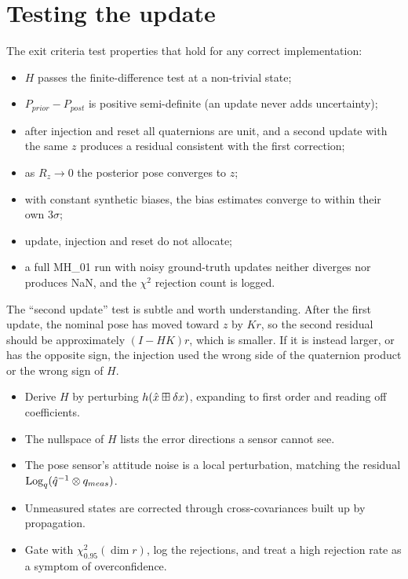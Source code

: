 \section{Testing the update}

\begin{projectlink}[Milestone 6]
The exit criteria test properties that hold for any correct implementation:
\begin{itemize}
  \item $H$ passes the finite-difference test at a non-trivial state;
  \item $P_{prior} - P_{post}$ is positive semi-definite (an update never adds uncertainty);
  \item after injection and reset all quaternions are unit, and a second update with the same $z$ produces a residual
        consistent with the first correction;
  \item as $R_z \to 0$ the posterior pose converges to $z$;
  \item with constant synthetic biases, the bias estimates converge to within their own $3\sigma$;
  \item update, injection and reset do not allocate;
  \item a full MH\_01 run with noisy ground-truth updates neither diverges nor produces NaN, and the $\chi^2$ rejection
        count is logged.
\end{itemize}
\end{projectlink}

The ``second update'' test is subtle and worth understanding. After the first update, the nominal pose has moved
toward $z$ by $K r$, so the second residual should be approximately $(I - HK)r$, which is smaller. If it is instead
larger, or has the opposite sign, the injection used the wrong side of the quaternion product or the wrong sign of
$H$.

\begin{takeaways}
\begin{itemize}
  \item Derive $H$ by perturbing $h(\hat x\boxplus\delta x)$, expanding to first order and reading off coefficients.
  \item The nullspace of $H$ lists the error directions a sensor cannot see.
  \item The pose sensor's attitude noise is a local perturbation, matching the residual $\operatorname{Log}_q(\hat q^{-1}\otimes q_{meas})$.
  \item Unmeasured states are corrected through cross-covariances built up by propagation.
  \item Gate with $\chi^2_{0.95}(\dim r)$, log the rejections, and treat a high rejection rate as a symptom of overconfidence.
\end{itemize}
\end{takeaways}

